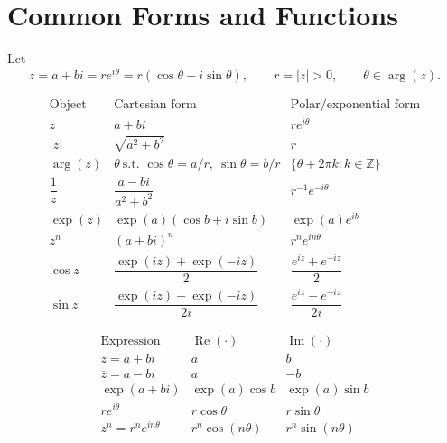 \documentclass[11pt]{article}
\newcommand{\Z}{\mathbb{Z}}
\newcommand{\abs}[1]{\left|#1\right|}
\newcommand{\conj}[1]{\overline{#1}}
\newcommand{\Real}{\operatorname{Re}}
\newcommand{\Imag}{\operatorname{Im}}
\begin{document}
\newpage
\section*{Common Forms and Functions}

Let
\[
  z=a+bi=re^{i\theta}=r(\cos\theta+i\sin\theta),
  \qquad
  r=\abs{z}>0,
  \qquad
  \theta\in\arg(z).
\]

\[
\begin{array}{c|c|c}
\text{Object} & \text{Cartesian form} & \text{Polar/exponential form} \\
\hline
z & a+bi & re^{i\theta} \\
\abs{z} & \sqrt{a^{2}+b^{2}} & r \\
\arg(z) & \theta\ \text{s.t. } \cos\theta=a/r,\ \sin\theta=b/r
        & \{\theta+2\pi k:k\in\Z\} \\
\dfrac{1}{z} & \dfrac{a-bi}{a^{2}+b^{2}} & r^{-1}e^{-i\theta} \\
\exp(z) & \exp(a)(\cos b+i\sin b) & \exp(a)e^{ib} \\
z^{n} & (a+bi)^{n} & r^{n}e^{in\theta} \\
\cos z & \dfrac{\exp(iz)+\exp(-iz)}{2} & \dfrac{e^{iz}+e^{-iz}}{2} \\
\sin z & \dfrac{\exp(iz)-\exp(-iz)}{2i} & \dfrac{e^{iz}-e^{-iz}}{2i}
\end{array}
\]

\[
\begin{array}{c|c|c}
\text{Expression} & \Real(\cdot) & \Imag(\cdot) \\
\hline
z=a+bi & a & b \\
\conj{z}=a-bi & a & -b \\
\exp(a+bi) & \exp(a)\cos b & \exp(a)\sin b \\
r e^{i\theta} & r\cos\theta & r\sin\theta \\
z^{n}=r^{n}e^{in\theta} & r^{n}\cos(n\theta) & r^{n}\sin(n\theta)
\end{array}
\]
\end{document}
